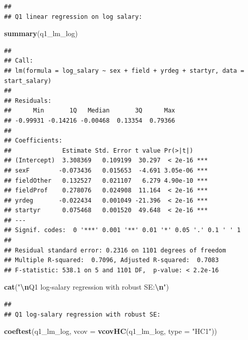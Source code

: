 \documentclass[
]{article}
\newenvironment{Shaded}{\begin{snugshade}}{\end{snugshade}}
\newcommand{\AttributeTok}[1]{\textcolor[rgb]{0.13,0.29,0.53}{#1}}
\newcommand{\FunctionTok}[1]{\textcolor[rgb]{0.13,0.29,0.53}{\textbf{#1}}}
\newcommand{\NormalTok}[1]{#1}
\newcommand{\SpecialCharTok}[1]{\textcolor[rgb]{0.81,0.36,0.00}{\textbf{#1}}}
\newcommand{\StringTok}[1]{\textcolor[rgb]{0.31,0.60,0.02}{#1}}
\begin{document}
\begin{verbatim}
## 
## Q1 linear regression on log salary:
\end{verbatim}

\begin{Shaded}
\begin{Highlighting}[]
\FunctionTok{summary}\NormalTok{(q1\_lm\_log)}
\end{Highlighting}
\end{Shaded}

\begin{verbatim}
## 
## Call:
## lm(formula = log_salary ~ sex + field + yrdeg + startyr, data = start_salary)
## 
## Residuals:
##      Min       1Q   Median       3Q      Max 
## -0.99931 -0.14216 -0.00468  0.13354  0.79366 
## 
## Coefficients:
##              Estimate Std. Error t value Pr(>|t|)    
## (Intercept)  3.308369   0.109199  30.297  < 2e-16 ***
## sexF        -0.073436   0.015653  -4.691 3.05e-06 ***
## fieldOther   0.132527   0.021107   6.279 4.90e-10 ***
## fieldProf    0.278076   0.024908  11.164  < 2e-16 ***
## yrdeg       -0.022434   0.001049 -21.396  < 2e-16 ***
## startyr      0.075468   0.001520  49.648  < 2e-16 ***
## ---
## Signif. codes:  0 '***' 0.001 '**' 0.01 '*' 0.05 '.' 0.1 ' ' 1
## 
## Residual standard error: 0.2316 on 1101 degrees of freedom
## Multiple R-squared:  0.7096, Adjusted R-squared:  0.7083 
## F-statistic: 538.1 on 5 and 1101 DF,  p-value: < 2.2e-16
\end{verbatim}

\begin{Shaded}
\begin{Highlighting}[]
\FunctionTok{cat}\NormalTok{(}\StringTok{"}\SpecialCharTok{\textbackslash{}n}\StringTok{Q1 log{-}salary regression with robust SE:}\SpecialCharTok{\textbackslash{}n}\StringTok{"}\NormalTok{)}
\end{Highlighting}
\end{Shaded}

\begin{verbatim}
## 
## Q1 log-salary regression with robust SE:
\end{verbatim}

\begin{Shaded}
\begin{Highlighting}[]
\FunctionTok{coeftest}\NormalTok{(q1\_lm\_log, }\AttributeTok{vcov =} \FunctionTok{vcovHC}\NormalTok{(q1\_lm\_log, }\AttributeTok{type =} \StringTok{"HC1"}\NormalTok{))}
\end{Highlighting}
\end{Shaded}
\end{document}
